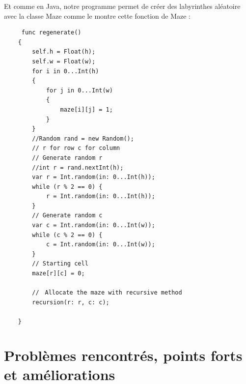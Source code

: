 \documentclass{article}
\begin{document}
Et comme en Java, notre programme permet de créer des labyrinthes aléatoire avec la classe Maze comme le montre cette fonction de Maze :
\begin{verbatim}
     func regenerate()
    {
        self.h = Float(h);
        self.w = Float(w);
        for i in 0...Int(h)
        {
            for j in 0...Int(w)
            {
                maze[i][j] = 1;
            }
        }
        //Random rand = new Random();
        // r for row c for column
        // Generate random r
        //int r = rand.nextInt(h);
        var r = Int.random(in: 0...Int(h));
        while (r % 2 == 0) {
            r = Int.random(in: 0...Int(h));
        }
        // Generate random c
        var c = Int.random(in: 0...Int(w));
        while (c % 2 == 0) {
            c = Int.random(in: 0...Int(w));
        }
        // Starting cell
        maze[r][c] = 0;

        //　Allocate the maze with recursive method
        recursion(r: r, c: c);

    }
\end{verbatim}
\section{Problèmes rencontrés, points forts et améliorations}
\end{document}
